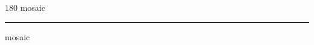 
\begin{frame}
\begin{center}
\begin{turn}{180}
{\fontsize{2.5cm}{1em}\selectfont mosaic}
\end{turn}
\vspace{1em}\par  
\hrule
\vspace{1em}\par  
{\fontsize{2.5cm}{1em}\selectfont mosaic}
\end{center}
\end{frame}
